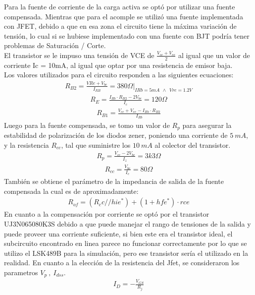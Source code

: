 Para la fuente de corriente de la carga activa se optó por utilizar una fuente compensada. Mientras que para el acomple se utilizó una fuente implementada con JFET, debido a que en esa zona el circuito tiene la máxima variación de tensión, lo cual si se hubiese implementado con una fuente con BJT podría tener problemas de Saturación / Corte.\\
El transistor se le impuso una tensión de VCE de $\frac{V_{cc}+V_{ee}}{2}$ al igual que un valor de corriente Ic = 10mA, al igual que optar por una resistencia de emisor baja.\\
Los valores utilizados para el circuito responden a las siguientes ecuaciones:
\begin{align}
R_{B2}= \frac{V{Re}+V_{be}}{I_{RB}} = 380 \Omega |_{IRb=5mA \  \ \wedge \ \  Vre=1.2V}
\end{align}
\begin{align}
R_E=\frac{I_{Rb}\cdot R_{B2}-2V_{be}}{I_c}=120\Omega
\end{align}
\begin{align}
R_{B1}= \frac{V_{cc}+V_{ee}-I_{Rb}\cdot R_{B2}}{I_{Rb}}
\end{align}
Luego para la fuente compensada, se tomo un valor de $R_p$ para asegurar la estabilidad de polarización de los diodos zener, poniendo una corriente de $5 \ mA$, y la resistencia $R_{cc}$, tal que suministre los $10 \ mA$ al colector del transistor.
\begin{align}
R_p = \frac{V_{cc}-2V_{be}}{I_z}=3k3\Omega
\end{align}
\begin{align}
R_{cc}=\frac{V_{be}}{I_c}=80\Omega
\end{align}
También se obtiene el parámetro de la impedancia de salida de la fuente compensada la cual es de aproximadamente:
\begin{align}
R_{of} = (R_cc // hie^*)+(1+hfe^* )\cdot rce
\end{align}
En cuanto a la compensación por corriente se optó por el transistor UJ3N065080K3S debido a que puede manejar el rango de tensiones de la salida y puede proveer una corriente suficiente, si bien este era el transistor ideal, el subcircuito encontrado en linea parece no funcionar correctamente por lo que se utilizo el LSK489B para la simulación, pero ese transistor sería el utilizado en la realidad. En cuanto a la  elección de la resistencia del Jfet, se consideraron los parametros $V_p \ , \ I_{dss}$.
\begin{align}
I_D=-\frac{V_{GS}}{R_j}
\end{align}
